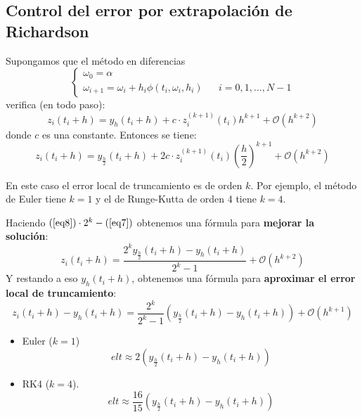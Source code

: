 \newpage
\subsection{Control del error por extrapolación de Richardson}
\begin{theorem}
Supongamos que el método en diferencias 
\begin{equation*}
\left\{
\begin{array}{lll}
\omega_0 = \alpha & & \\
\omega_{i+1} = \omega_i + h_i \phi(t_i, \omega_i, h_i) & & i = 0,1,\dots, N-1
\end{array}
\right.
\end{equation*}
verifica (en todo paso): 
\begin{equation}
\label{eq7}
z_i(t_i+h) = y_h(t_i+h) + c\cdot z_i^{(k+1)}(t_i)h^{k+1} + \mathcal{O}(h^{k+2})
\end{equation}
donde $c$ es una constante. Entonces se tiene:
\begin{equation}
\label{eq8}
z_i(t_i+h) = y_{\frac{h}{2}}(t_i+h) + 2c\cdot z_i^{(k+1)}(t_i)\left(\frac{h}{2}\right)^{k+1} + \mathcal{O}(h^{k+2})
\end{equation}
\end{theorem}
\begin{remark}
En este caso el error local de truncamiento es de orden $k$. Por ejemplo, el método de Euler tiene $k=1$ y el de Runge-Kutta de orden 4 tiene $k=4$.
\end{remark}

Haciendo $(\ref{eq8})\cdot 2^k - (\ref{eq7})$ obtenemos una fórmula para \textbf{mejorar la solución}:
\begin{equation}
\label{eq9}
z_i(t_i+h) = \frac{2^ky_{\frac{h}{2}}(t_i+h)-y_h(t_i+h)}{2^k-1}+\mathcal{O}(h^{k+2})
\end{equation}
Y restando a eso $y_h(t_i+h)$, obtenemos una fórmula para \textbf{aproximar el error local de truncamiento}:
\begin{equation}
\label{eq10}
z_i(t_i+h) -y_h(t_i+h)= \frac{2^k}{2^k-1}\left(y_{\frac{h}{2}}(t_i+h)-y_h(t_i+h)\right)+\mathcal{O}(h^{k+1})
\end{equation}
\begin{example}
\begin{itemize}
    \item Euler ($k=1$)  
    $$
    elt \approx 2\left(y_{\frac{h}{2}}(t_i+h)-y_h(t_i+h)\right)
    $$
    \item RK4 ($k=4$).
    $$
    elt \approx \frac{16}{15}\left(y_{\frac{h}{2}}(t_i+h)-y_h(t_i+h)\right)
    $$
\end{itemize}
\end{example}

